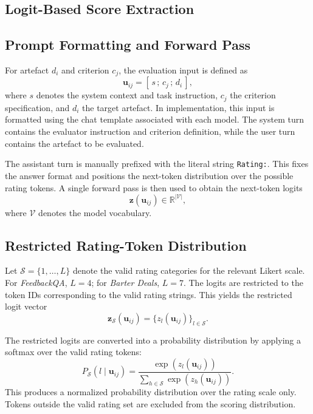 \subsection{Logit-Based Score Extraction}\label{app:logit_score_extraction}



\subsection{Prompt Formatting and Forward Pass}

For artefact $d_i$ and criterion $c_j$, the evaluation input is defined as
\[
    \mathbf{u}_{ij} = [\, s \,;\, c_j \,;\, d_i \,],
\]
where $s$ denotes the system context and task instruction, $c_j$ the criterion specification, and $d_i$ the target artefact. In implementation, this input is formatted using the chat template associated with each model. The system turn contains the evaluator instruction and criterion definition, while the user turn contains the artefact to be evaluated.

The assistant turn is manually prefixed with the literal string \texttt{Rating:}. This fixes the answer format and positions the next-token distribution over the possible rating tokens. A single forward pass is then used to obtain the next-token logits
\[
    \mathbf{z}(\mathbf{u}_{ij}) \in \mathbb{R}^{|\mathcal{V}|},
\]
where $\mathcal{V}$ denotes the model vocabulary.

\subsection{Restricted Rating-Token Distribution}

Let $\mathcal{S}=\{1,\ldots,L\}$ denote the valid rating categories for the relevant Likert scale. For \textit{FeedbackQA}, $L=4$; for \textit{Barter Deals}, $L=7$. The logits are restricted to the token IDs corresponding to the valid rating strings. This yields the restricted logit vector
\[
    \mathbf{z}_{\mathcal{S}}(\mathbf{u}_{ij})
    =
    \{ z_l(\mathbf{u}_{ij}) \}_{l \in \mathcal{S}}.
\]

The restricted logits are converted into a probability distribution by applying a softmax over the valid rating tokens:
\begin{equation}
P_{\mathcal{S}}(l \mid \mathbf{u}_{ij}) =
\frac{\exp(z_l(\mathbf{u}_{ij}))}
{\sum_{h \in \mathcal{S}} \exp(z_h(\mathbf{u}_{ij}))}.
\end{equation}
This produces a normalized probability distribution over the rating scale only. Tokens outside the valid rating set are excluded from the scoring distribution.

